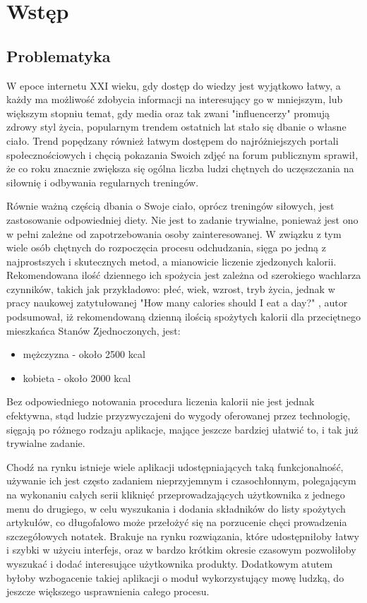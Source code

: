 \documentclass[12pt, a4paper]{article}
\begin{document}
\begin{sloppypar}


\tableofcontents
\newpage

\section{Wstęp}
{
  \subsection{Problematyka}
  {
    W epoce internetu XXI wieku, gdy dostęp do wiedzy jest wyjątkowo łatwy, a 
    każdy ma możliwość zdobycia informacji na interesujący go w mniejszym,
    lub większym stopniu temat, gdy media oraz tak zwani "influencerzy" promują zdrowy
    styl życia, popularnym trendem ostatnich lat stało się dbanie o własne ciało. 
    Trend popędzany również łatwym dostępem do najróżniejszych portali
    społecznościowych i chęcią pokazania Swoich zdjęć na forum publicznym sprawił, 
    że co roku znacznie zwiększa się ogólna liczba ludzi chętnych do uczęszczania na
    siłownię i odbywania regularnych treningów.

    Równie ważną częścią dbania o Swoje ciało, oprócz treningów siłowych, jest 
    zastosowanie odpowiedniej diety. Nie jest to zadanie trywialne, ponieważ jest 
    ono w pełni zależne od zapotrzebowania osoby zainteresowanej. W związku z tym
    wiele osób chętnych do rozpoczęcia procesu odchudzania, sięga po jedną z
    najprostszych i skutecznych metod, a mianowicie liczenie zjedzonych kalorii.
    Rekomendowana ilość dziennego ich spożycia jest zależna od szerokiego wachlarza
    czynników, takich jak przykładowo: płeć, wiek, wzrost, tryb życia, 
    jednak w pracy naukowej zatytułowanej "How many calories should I eat a day?"
    \cite{cal}, autor podsumował, iż rekomendowaną dzienną ilością spożytych kalorii 
    dla przeciętnego mieszkańca Stanów Zjednoczonych, jest:
    \begin{itemize}
      \item mężczyzna - około 2500 kcal
      \item kobieta - około 2000 kcal
    \end{itemize}
    Bez odpowiedniego notowania procedura liczenia kalorii nie jest jednak efektywna, 
    stąd ludzie przyzwyczajeni do wygody oferowanej przez technologię, sięgają po 
    różnego rodzaju aplikacje, mające jeszcze bardziej ułatwić to, i tak już trywialne
    zadanie.

    Chodź na rynku istnieje wiele aplikacji udostępniających taką funkcjonalność,
    używanie ich jest często zadaniem nieprzyjemnym i czasochłonnym, polegającym
    na wykonaniu całych serii kliknięć przeprowadzających użytkownika z jednego menu
    do drugiego, w celu wyszukania i dodania składników do listy spożytych artykułów,
    co długofalowo może przełożyć się na porzucenie chęci prowadzenia szczegółowych
    notatek. Brakuje na rynku rozwiązania, które udostępniłoby łatwy i szybki
    w użyciu interfejs, oraz w bardzo krótkim okresie czasowym pozwoliłoby wyszukać 
    i dodać interesujące użytkownika produkty. Dodatkowym atutem byłoby wzbogacenie
    takiej aplikacji o moduł wykorzystujący mowę ludzką, do jeszcze większego 
    usprawnienia całego procesu.
  }
}
\end{sloppypar}
\end{document}
